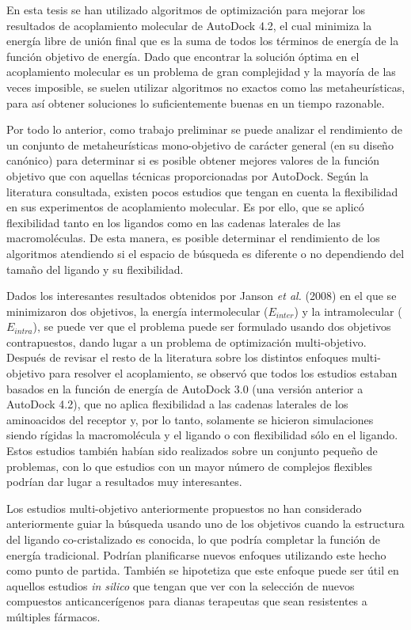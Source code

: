 En esta tesis se han utilizado algoritmos de optimización para mejorar los resultados de acoplamiento molecular de AutoDock 4.2, el cual minimiza la energía libre de unión final que es la suma de todos los términos de energía de la función objetivo de energía. Dado que encontrar la solución óptima en el acoplamiento molecular es un problema de gran complejidad y la mayoría de las veces imposible, se suelen utilizar algoritmos no exactos como las metaheurísticas, para así obtener soluciones lo suficientemente buenas en un tiempo razonable.

Por todo lo anterior, como trabajo preliminar se puede analizar el rendimiento de un conjunto de metaheurísticas mono-objetivo de carácter general (en su diseño canónico) para determinar si es posible obtener mejores valores de la función objetivo que con aquellas técnicas proporcionadas por AutoDock. Según la literatura consultada, existen pocos estudios que tengan en cuenta la flexibilidad en sus experimentos de acoplamiento molecular. Es por ello, que se aplicó flexibilidad tanto en los ligandos como en las cadenas laterales de las macromoléculas. De esta manera, es posible determinar el rendimiento de los algoritmos atendiendo si el espacio de búsqueda es diferente o no dependiendo del tamaño del ligando y su flexibilidad.

Dados los interesantes resultados obtenidos por Janson \emph{et al.} (2008) en el que se minimizaron dos objetivos, la energía intermolecular ($E_{inter}$) y la intramolecular ($E_{intra}$), se puede ver que el problema puede ser formulado usando dos objetivos contrapuestos, dando lugar a un problema de optimización multi-objetivo. Después de revisar el resto de la literatura sobre los distintos enfoques multi-objetivo para resolver el acoplamiento, se observó que todos los estudios estaban basados en la función de energía de AutoDock 3.0 (una versión anterior a AutoDock 4.2), que no aplica flexibilidad a las cadenas laterales de los aminoacidos del receptor y, por lo tanto, solamente se hicieron simulaciones siendo rígidas la macromolécula y el ligando o con flexibilidad sólo en el ligando. Estos estudios también habían sido realizados sobre un conjunto pequeño de problemas, con lo que estudios con un mayor número de complejos flexibles podrían dar lugar a resultados muy interesantes.

Los estudios multi-objetivo anteriormente propuestos no han considerado anteriormente guiar la búsqueda usando uno de los objetivos cuando la estructura del ligando co-cristalizado es conocida, lo que podría completar la función de energía tradicional. Podrían planificarse nuevos enfoques utilizando este hecho como punto de partida. También se hipotetiza que este enfoque puede ser útil en aquellos estudios \emph{in silico} que tengan que ver con la selección de nuevos compuestos anticancerígenos para dianas terapeutas que sean resistentes a múltiples fármacos.

